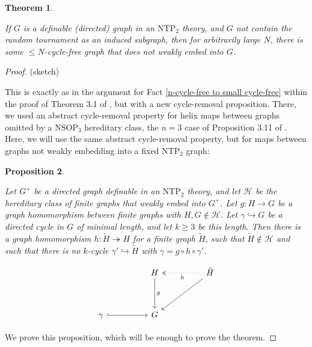 \documentclass{amsart}
\newtheorem{theorem}{Theorem}[section]
\newtheorem{prop}[theorem]{Proposition}
\theoremstyle{definition}
\theoremstyle{remark}
\numberwithin{equation}{section}
\begin{document}
\begin{tcolorbox}
\begin{theorem}\label{ntp2 graph theory}

 If $G$ is a definable (directed) graph in an $\mathrm{NTP}_{2}$ theory, and $G$ not contain the random tournament as an induced subgraph, then for arbitrarily large $N$, there is some $\leq N$-cycle-free graph that does not weakly embed into $G$. 


\end{theorem}

 \begin{proof} (sketch)

 
     \: This is exactly as in the argument for Fact \ref{n-cycle-free to small cycle-free} within the proof of Theorem 3.1 of \cite{ApproxOrder}, but with a new cycle-removal proposition.  There, we used an abstract cycle-removal property for helix maps between graphs omitted by a $\mathrm{NSOP}_{3}$ hereditary class, the $n=3$ case of Proposition 3.11 of \cite{ApproxOrder}. Here, we will use the same abstract cycle-removal property, but for maps between graphs not weakly embedding into a fixed $\mathrm{NTP}_{2}$ graph:

     \begin{prop}\label{ntp_2 cycle removal}
    
Let $G^{+}$ be a directed graph definable in an $\mathrm{NTP}_{2}$ theory, and let $\mathcal{H}$ be the hereditary class of finite graphs that weakly embed into $G^{+}$. Let $g: H \to G$ be a graph homomorphism between finite graphs with $H, G \notin \mathcal{H}$. Let $\gamma \hookrightarrow G$ be a directed cycle in $G$ of minimal length, and let $k \geq 3 $ be this length. Then there is a graph homomorphism $h: \tilde{H} \twoheadrightarrow H$ for a finite graph $\tilde{H}$, such that $\tilde{H} \notin \mathcal{H}$ and such that there is no $k$-cycle $\gamma' \hookrightarrow \tilde{H}$ with $\gamma = g\circ h\circ \gamma' $.

$$\begin{tikzcd}
                        &  & H \arrow[dd, "g"] &  & \tilde{H} \arrow[ll, two heads, "h", dotted] \arrow[lldd] \\
                        &  &              &  &                                      \\
\gamma \arrow[rr, hook] &  & G            &  &                                     
\end{tikzcd}$$

\end{prop}

\: We prove this proposition, which will be enough to prove the theorem.



\end{proof}
\end{tcolorbox}
\end{document}

